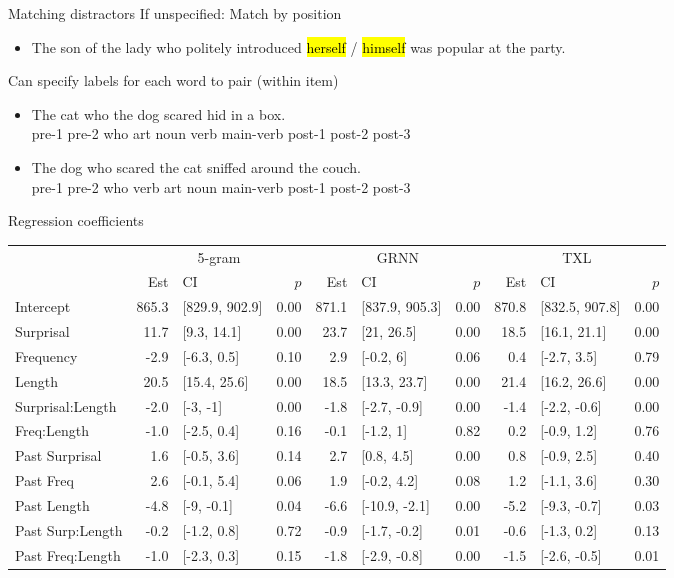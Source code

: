 \documentclass[12pt, xcolor=beamer,table,usenames,dvipsnames, ignorenonframetext, ngerman]{beamer}
\makeatletter
\let\HL\hl
\renewcommand\hl{%
	\let\set@color\beamerorig@set@color
	\let\reset@color\beamerorig@reset@color
	\HL}
\makeatother
\begin{document}
\begin{frame}{Matching distractors}
If unspecified: Match by position
\begin{itemize}
	\item The son of the lady who politely introduced  \hl{herself} / \hl{himself} was popular at the party.
\end{itemize}
Can specify labels for each word to pair (within item)
\begin{itemize}
	\item The cat who the dog scared hid in a box.\\pre-1 pre-2 who art noun verb main-verb post-1 post-2 post-3
\item The dog who scared the cat sniffed around the couch.\\ pre-1 pre-2 who verb art noun main-verb post-1 post-2 post-3
\end{itemize}
\end{frame}


\begin{frame}{Regression coefficients}
\begin{tiny}
\begin{tabular}{l|rlr|rlr|rlr}
	\hline
	&\multicolumn{3}{c|}{5-gram}&\multicolumn{3}{c|}{GRNN}&\multicolumn{3}{c}{TXL}\\
	& Est & CI & $p$ & Est & CI & $p$ &Est & CI & $p$ \\ 
	\hline
	Intercept & 865.3 & [829.9, 902.9] & 0.00 & 871.1 & [837.9, 905.3] & 0.00 & 870.8 & [832.5, 907.8] & 0.00 \\ 
	Surprisal & 11.7 & [9.3, 14.1] & 0.00 & 23.7 & [21, 26.5] & 0.00 & 18.5 & [16.1, 21.1] & 0.00 \\ 
	Frequency & -2.9 & [-6.3, 0.5] & 0.10 & 2.9 & [-0.2, 6] & 0.06 & 0.4 & [-2.7, 3.5] & 0.79 \\ 
	Length & 20.5 & [15.4, 25.6] & 0.00 & 18.5 & [13.3, 23.7] & 0.00 & 21.4 & [16.2, 26.6] & 0.00 \\ 
	Surprisal:Length & -2.0 & [-3, -1] & 0.00 & -1.8 & [-2.7, -0.9] & 0.00 & -1.4 & [-2.2, -0.6] & 0.00 \\
	Freq:Length & -1.0 & [-2.5, 0.4] & 0.16 & -0.1 & [-1.2, 1] & 0.82 & 0.2 & [-0.9, 1.2] & 0.76 \\ 
	\hline
	Past Surprisal & 1.6 & [-0.5, 3.6] & 0.14 & 2.7 & [0.8, 4.5] & 0.00 & 0.8 & [-0.9, 2.5] & 0.40 \\ 
	Past Freq & 2.6 & [-0.1, 5.4] & 0.06 & 1.9 & [-0.2, 4.2] & 0.08 & 1.2 & [-1.1, 3.6] & 0.30 \\ 
	Past Length & -4.8 & [-9, -0.1] & 0.04 & -6.6 & [-10.9, -2.1] & 0.00 & -5.2 & [-9.3, -0.7] & 0.03 \\ 
	Past Surp:Length & -0.2 & [-1.2, 0.8] & 0.72 & -0.9 & [-1.7, -0.2] & 0.01 & -0.6 & [-1.3, 0.2] & 0.13 \\ 
	Past Freq:Length & -1.0 & [-2.3, 0.3] & 0.15 & -1.8 & [-2.9, -0.8] & 0.00 & -1.5 & [-2.6, -0.5] & 0.01 \\ 	
	\hline
\end{tabular}
\end{tiny}
\end{frame}
\end{document}
